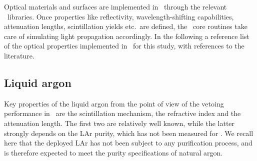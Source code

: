 Optical materials and surfaces are implemented in \mage\ through the relevant \geant\
libraries. Once properties like reflectivity, wavelength-shifting capabilities,
attenuation lengths, scintillation yields etc.~are defined, the \geant\ core routines take
care of simulating light propagation accordingly. In the following a reference list of the
optical properties implemented in \mage\ for this study, with references to the
literature.

\subsection{Liquid argon}
Key properties of the liquid argon from the point of view of the vetoing performance in
\gerda\ are the scintillation mechanism, the refractive index and the attenuation length.
The first two are relatively well known, while the latter strongly depends on the LAr
purity, which has not been measured for \gerda. We recall here that the deployed LAr has
not been subject to any purification process, and is therefore expected to meet the purity
specifications of natural argon.

